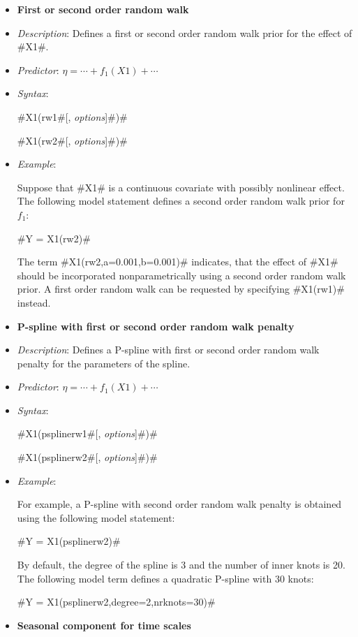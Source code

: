 \begin{itemize}
\item[]{\bf\sffamily First or second order random walk}

\item[] {\em Description}: Defines a first or second order random walk prior for the effect of #X1#.
\item[] {\em Predictor}: $\eta = \cdots + f_1(X1) + \cdots $
\item[] {\em Syntax}:

#X1(rw1#[, {\em options}]#)#

#X1(rw2#[, {\em options}]#)#
\item[] {\em Example}:

Suppose that #X1# is a continuous covariate with possibly
nonlinear effect. The following model statement defines a second
order random walk prior for $f_1$:

#Y = X1(rw2)#

The term #X1(rw2,a=0.001,b=0.001)# indicates, that the effect of
#X1# should be incorporated nonparametrically using a second order
random walk prior. A first order random walk can be requested by
specifying #X1(rw1)# instead.

\item[] {\bf\sffamily P-spline with first or second order random
walk penalty}

\item[] {\em Description}: Defines a P-spline with first or second
order random walk penalty for the parameters of the spline.
\item[] {\em Predictor}: $\eta =  \cdots + f_1(X1) + \cdots$
\item[] {\em Syntax}:

#X1(psplinerw1#[, {\em options}]#)#

#X1(psplinerw2#[, {\em options}]#)#
\item[] {\em Example}:

For example, a P-spline with second order random walk penalty is
obtained using the following model statement:

#Y = X1(psplinerw2)#

By default, the degree of the spline is 3 and the number of inner
knots is 20. The following model term defines a quadratic P-spline
with 30 knots:

#Y = X1(psplinerw2,degree=2,nrknots=30)#

\item[]{\bf\sffamily Seasonal component for time scales}


\end{itemize}
